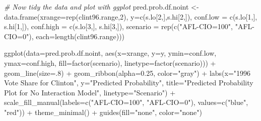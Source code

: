 \documentclass[
]{article}
\newenvironment{Shaded}{\begin{snugshade}}{\end{snugshade}}
\newcommand{\AttributeTok}[1]{\textcolor[rgb]{0.77,0.63,0.00}{#1}}
\newcommand{\CommentTok}[1]{\textcolor[rgb]{0.56,0.35,0.01}{\textit{#1}}}
\newcommand{\DecValTok}[1]{\textcolor[rgb]{0.00,0.00,0.81}{#1}}
\newcommand{\FloatTok}[1]{\textcolor[rgb]{0.00,0.00,0.81}{#1}}
\newcommand{\FunctionTok}[1]{\textcolor[rgb]{0.00,0.00,0.00}{#1}}
\newcommand{\NormalTok}[1]{#1}
\newcommand{\OtherTok}[1]{\textcolor[rgb]{0.56,0.35,0.01}{#1}}
\newcommand{\SpecialCharTok}[1]{\textcolor[rgb]{0.00,0.00,0.00}{#1}}
\newcommand{\StringTok}[1]{\textcolor[rgb]{0.31,0.60,0.02}{#1}}
\begin{document}
\begin{Shaded}
\begin{Highlighting}[]
\CommentTok{\# Now tidy the data and plot with ggplot}
\NormalTok{pred.prob.df.noint }\OtherTok{\textless{}{-}} \FunctionTok{data.frame}\NormalTok{(}\AttributeTok{xrange=}\FunctionTok{rep}\NormalTok{(clint96.range,}\DecValTok{2}\NormalTok{), }
                           \AttributeTok{y=}\FunctionTok{c}\NormalTok{(s.lo[}\DecValTok{2}\NormalTok{,],s.hi[}\DecValTok{2}\NormalTok{,]),}
                           \AttributeTok{conf.low =} \FunctionTok{c}\NormalTok{(s.lo[}\DecValTok{1}\NormalTok{,], s.hi[}\DecValTok{1}\NormalTok{,]),}
                           \AttributeTok{conf.high =} \FunctionTok{c}\NormalTok{(s.lo[}\DecValTok{3}\NormalTok{,], s.hi[}\DecValTok{3}\NormalTok{,]),}
                           \AttributeTok{scenario =} \FunctionTok{rep}\NormalTok{(}\FunctionTok{c}\NormalTok{(}\StringTok{"AFL{-}CIO=100"}\NormalTok{, }\StringTok{"AFL{-}CIO=0"}\NormalTok{), }
                                          \AttributeTok{each=}\FunctionTok{length}\NormalTok{(clint96.range)))}

\FunctionTok{ggplot}\NormalTok{(}\AttributeTok{data=}\NormalTok{pred.prob.df.noint, }\FunctionTok{aes}\NormalTok{(}\AttributeTok{x=}\NormalTok{xrange, }\AttributeTok{y=}\NormalTok{y,}
                              \AttributeTok{ymin=}\NormalTok{conf.low,}
                              \AttributeTok{ymax=}\NormalTok{conf.high,}
                              \AttributeTok{fill=}\FunctionTok{factor}\NormalTok{(scenario),}
                              \AttributeTok{linetype=}\FunctionTok{factor}\NormalTok{(scenario))) }\SpecialCharTok{+}
  \FunctionTok{geom\_line}\NormalTok{(}\AttributeTok{size=}\NormalTok{.}\DecValTok{8}\NormalTok{) }\SpecialCharTok{+}
  \FunctionTok{geom\_ribbon}\NormalTok{(}\AttributeTok{alpha=}\FloatTok{0.25}\NormalTok{, }\AttributeTok{color=}\StringTok{"gray"}\NormalTok{) }\SpecialCharTok{+}
  \FunctionTok{labs}\NormalTok{(}\AttributeTok{x=}\StringTok{"1996 Vote Share for Clinton"}\NormalTok{, }\AttributeTok{y=}\StringTok{"Predicted Probability"}\NormalTok{,}
       \AttributeTok{title=}\StringTok{"Predicted Probability Plot for No Interaction Model"}\NormalTok{, }\AttributeTok{linetype=}\StringTok{"Scenario"}\NormalTok{) }\SpecialCharTok{+}
  \FunctionTok{scale\_fill\_manual}\NormalTok{(}\AttributeTok{labels=}\FunctionTok{c}\NormalTok{(}\StringTok{"AFL{-}CIO=100"}\NormalTok{, }\StringTok{"AFL{-}CIO=0"}\NormalTok{), }
                    \AttributeTok{values=}\FunctionTok{c}\NormalTok{(}\StringTok{"blue"}\NormalTok{, }\StringTok{"red"}\NormalTok{)) }\SpecialCharTok{+}
  \FunctionTok{theme\_minimal}\NormalTok{() }\SpecialCharTok{+}
  \FunctionTok{guides}\NormalTok{(}\AttributeTok{fill=}\StringTok{"none"}\NormalTok{, }\AttributeTok{color=}\StringTok{"none"}\NormalTok{)}
\end{Highlighting}
\end{Shaded}
\end{document}
